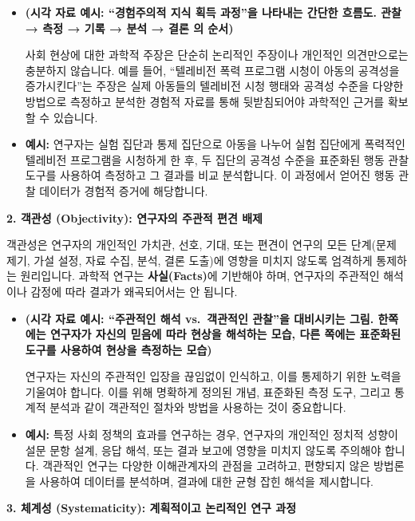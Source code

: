 \documentclass[
  letterpaper,
]{book}
\begin{document}
\begin{itemize}
\item
  \textbf{(시각 자료 예시: ``경험주의적 지식 획득 과정''을 나타내는
  간단한 흐름도. 관찰 → 측정 → 기록 → 분석 → 결론 의 순서)}

  사회 현상에 대한 과학적 주장은 단순히 논리적인 주장이나 개인적인
  의견만으로는 충분하지 않습니다. 예를 들어, ``텔레비전 폭력 프로그램
  시청이 아동의 공격성을 증가시킨다''는 주장은 실제 아동들의 텔레비전
  시청 행태와 공격성 수준을 다양한 방법으로 측정하고 분석한 경험적
  자료를 통해 뒷받침되어야 과학적인 근거를 확보할 수 있습니다.
\item
  \textbf{예시:} 연구자는 실험 집단과 통제 집단으로 아동을 나누어 실험
  집단에게 폭력적인 텔레비전 프로그램을 시청하게 한 후, 두 집단의 공격성
  수준을 표준화된 행동 관찰 도구를 사용하여 측정하고 그 결과를 비교
  분석합니다. 이 과정에서 얻어진 행동 관찰 데이터가 경험적 증거에
  해당합니다.
\end{itemize}

\textbf{2. 객관성 (Objectivity): 연구자의 주관적 편견 배제}

객관성은 연구자의 개인적인 가치관, 선호, 기대, 또는 편견이 연구의 모든
단계(문제 제기, 가설 설정, 자료 수집, 분석, 결론 도출)에 영향을 미치지
않도록 엄격하게 통제하는 원리입니다. 과학적 연구는
\textbf{사실(Facts)}에 기반해야 하며, 연구자의 주관적인 해석이나 감정에
따라 결과가 왜곡되어서는 안 됩니다.

\begin{itemize}
\item
  \textbf{(시각 자료 예시: ``주관적인 해석 vs.~객관적인 관찰''을
  대비시키는 그림. 한쪽에는 연구자가 자신의 믿음에 따라 현상을 해석하는
  모습, 다른 쪽에는 표준화된 도구를 사용하여 현상을 측정하는 모습)}

  연구자는 자신의 주관적인 입장을 끊임없이 인식하고, 이를 통제하기 위한
  노력을 기울여야 합니다. 이를 위해 명확하게 정의된 개념, 표준화된 측정
  도구, 그리고 통계적 분석과 같이 객관적인 절차와 방법을 사용하는 것이
  중요합니다.
\item
  \textbf{예시:} 특정 사회 정책의 효과를 연구하는 경우, 연구자의
  개인적인 정치적 성향이 설문 문항 설계, 응답 해석, 또는 결과 보고에
  영향을 미치지 않도록 주의해야 합니다. 객관적인 연구는 다양한
  이해관계자의 관점을 고려하고, 편향되지 않은 방법론을 사용하여 데이터를
  분석하며, 결과에 대한 균형 잡힌 해석을 제시합니다.
\end{itemize}

\textbf{3. 체계성 (Systematicity): 계획적이고 논리적인 연구 과정}
\end{document}
